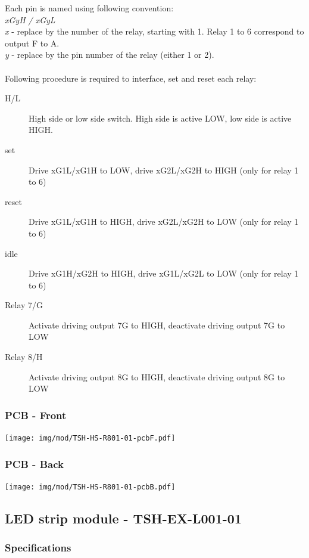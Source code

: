 \documentclass[]{scrreprt}%
\begin{document}
Each pin is named using following convention: \\
\textit{xGyH / xGyL}\\
\textit{x} - replace by the number of the relay, starting with 1. Relay 1 to 6 correspond to output F to A. \\
\textit{y} - replace by the pin number of the relay (either 1 or 2). \\
\hfill \\
Following procedure is required to interface, set and reset each relay:
\begin{description}
 \item[H/L] High side or low side switch. High side is active LOW, low side is active HIGH.
 \item[set] Drive xG1L/xG1H to LOW, drive xG2L/xG2H to HIGH (only for relay 1 to 6)
 \item[reset] Drive xG1L/xG1H to HIGH, drive xG2L/xG2H to LOW (only for relay 1 to 6)
 \item[idle] Drive xG1H/xG2H to HIGH, drive xG1L/xG2L to LOW (only for relay 1 to 6)
 \item[Relay 7/G] Activate driving output 7G to HIGH, deactivate driving output 7G to LOW
 \item[Relay 8/H] Activate driving output 8G to HIGH, deactivate driving output 8G to LOW
\end{description}


\subsubsection{PCB - Front}

\texttt{[image: img/mod/TSH-HS-R801-01-pcbF.pdf]}

\subsubsection{PCB - Back}

\texttt{[image: img/mod/TSH-HS-R801-01-pcbB.pdf]}

\newpage
\subsection{LED strip module - TSH-EX-L001-01}

\subsubsection{Specifications}
\end{document}

